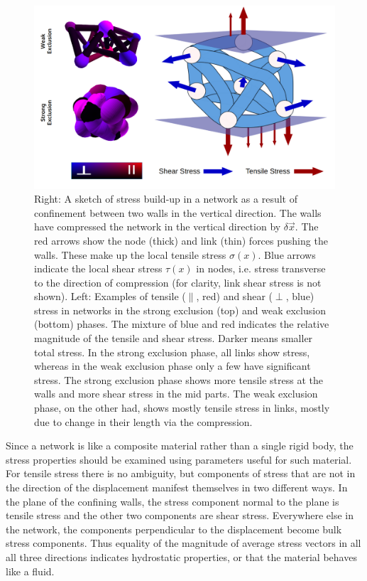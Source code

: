 \documentclass[nofootinbib,preprint,floatfix]{revtex4} %
\begin{document}
\begin{figure}
    \centering
    \includegraphics[width = .7\columnwidth]{fig-09-19/stress-ex.png}
    \caption{Right: A sketch of stress build-up in a network as a result of confinement between two walls in the vertical direction. 
    The walls have compressed the network in the vertical direction by $\delta \vec{x}$. 
    The red arrows show the node (thick) and link (thin) forces pushing the walls. 
    These make up the local tensile stress $\sigma(x)$. 
    Blue arrows indicate the local shear stress $\tau(x)$ in nodes, i.e. stress transverse to the direction of compression (for clarity, link shear stress is not shown).
    Left: Examples of tensile ($\parallel$, red) and shear ($\perp$, blue) stress in networks in the strong exclusion (top) and weak exclusion (bottom) phases. 
    The mixture of blue and red indicates the relative magnitude of the tensile and shear stress. Darker means smaller total stress.  
    In the strong exclusion phase, all links show stress, whereas in the weak exclusion phase only a few have significant stress. 
    The strong exclusion phase shows more tensile stress at the walls and more shear stress in the mid parts. 
    The weak exclusion phase, on the other had, shows mostly tensile stress in links, mostly due to change in their length via the compression.  }
    \label{fig:stress}
\end{figure}
{\color{red} Since a network is like a composite material rather than a single rigid body, the stress properties should be examined using parameters useful for such material. For tensile stress there is no ambiguity, but components of stress that are not in the direction of the displacement manifest themselves in two different ways. In the plane of the confining walls, the stress component normal to the plane is tensile stress and the other two components are shear stress. Everywhere else in the network, the components perpendicular to the displacement become bulk stress components. Thus equality of the magnitude of average stress vectors in all all three directions indicates hydrostatic properties, or that the material behaves like a fluid.}
\end{document}
